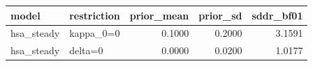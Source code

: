 \begin{tabular}{llrrr}
\toprule
model & restriction & prior\_mean & prior\_sd & sddr\_bf01 \\
\midrule
hsa\_steady & kappa\_0=0 & 0.1000 & 0.2000 & 3.1591 \\
hsa\_steady & delta=0 & 0.0000 & 0.0200 & 1.0177 \\
\bottomrule
\end{tabular}
